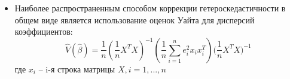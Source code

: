 \documentclass[a0,final]{a0poster}
\begin{document}
\begin{multicols}{4}
\begin{itemize}
\item Наиболее распространенным способом коррекции гетероскедастичности в общем виде является использование оценок Уайта для дисперсий коэффициентов:
$$\hat{V}(\hat{\beta}) = \frac{1}{n}(\frac{1}{n} {X^TX})^{-1} (\frac{1}{n} \sum\limits_{i=1}^n{e_i^2 x_i x_i^T}) {(\frac{1}{n} X^TX})^{-1} $$
где $x_i$ -- i-я строка матрицы $X, i=1,...,n$


\end{itemize}
\end{multicols}
\end{document}
